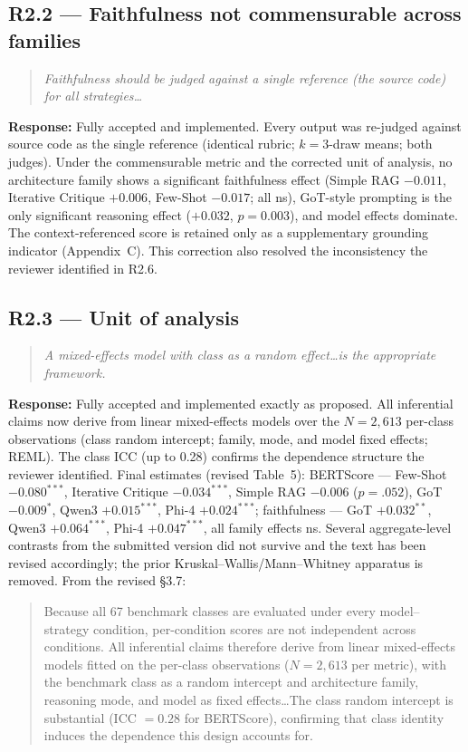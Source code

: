 \documentclass[11pt]{article}
\newcommand{\rcomment}[1]{\begin{quote}\itshape\color{black!70}#1\end{quote}}
\newcommand{\resp}{\noindent\textbf{Response:} }
\newcommand{\excerpt}[1]{\begin{quote}\small\color{blue!70!black}#1\end{quote}}
\begin{document}
\subsection*{R2.2 --- Faithfulness not commensurable across families}
\rcomment{Faithfulness should be judged against a single reference (the source code) for all strategies\dots}
\resp Fully accepted and implemented. Every output was re-judged against source code as the single reference (identical rubric; $k{=}3$-draw means; both judges). Under the commensurable metric and the corrected unit of analysis, no architecture family shows a significant faithfulness effect (Simple RAG $-0.011$, Iterative Critique $+0.006$, Few-Shot $-0.017$; all ns), GoT-style prompting is the only significant reasoning effect ($+0.032$, $p=0.003$), and model effects dominate. The context-referenced score is retained only as a supplementary grounding indicator (Appendix~C). This correction also resolved the inconsistency the reviewer identified in R2.6.

\subsection*{R2.3 --- Unit of analysis}
\rcomment{A mixed-effects model with class as a random effect\dots is the appropriate framework.}
\resp Fully accepted and implemented exactly as proposed. All inferential claims now derive from linear mixed-effects models over the $N{=}2{,}613$ per-class observations (class random intercept; family, mode, and model fixed effects; REML). The class ICC (up to 0.28) confirms the dependence structure the reviewer identified. Final estimates (revised Table~5): BERTScore --- Few-Shot $-0.080^{***}$, Iterative Critique $-0.034^{***}$, Simple RAG $-0.006$ ($p{=}.052$), GoT $-0.009^{*}$, Qwen3 $+0.015^{***}$, Phi-4 $+0.024^{***}$; faithfulness --- GoT $+0.032^{**}$, Qwen3 $+0.064^{***}$, Phi-4 $+0.047^{***}$, all family effects ns. Several aggregate-level contrasts from the submitted version did not survive and the text has been revised accordingly; the prior Kruskal--Wallis/Mann--Whitney apparatus is removed. From the revised \S3.7:
\excerpt{Because all 67 benchmark classes are evaluated under every model--strategy condition, per-condition scores are not independent across conditions. All inferential claims therefore derive from linear mixed-effects models fitted on the per-class observations ($N{=}2{,}613$ per metric), with the benchmark class as a random intercept and architecture family, reasoning mode, and model as fixed effects\ldots The class random intercept is substantial (ICC $=0.28$ for BERTScore), confirming that class identity induces the dependence this design accounts for.}
\end{document}
